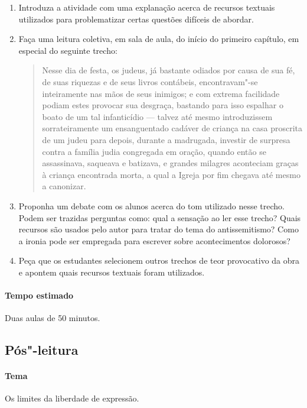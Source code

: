 \documentclass[12pt]{extarticle}
\begin{document}
\begin{enumerate} 

\item Introduza a atividade com uma explanação acerca de recursos textuais 
utilizados para problematizar certas questões difíceis de abordar. 

\item Faça uma leitura coletiva, em sala de aula, do início do primeiro capítulo,
em especial do seguinte trecho:

\begin{quote}
Nesse dia de festa, os judeus,
já bastante odiados por causa de sua fé, de suas riquezas e de seus
livros contábeis, encontravam"-se inteiramente nas mãos de seus
inimigos; e com extrema facilidade podiam estes provocar sua desgraça,
bastando para isso espalhar o boato de um tal infanticídio --- talvez até
mesmo introduzissem sorrateiramente um ensanguentado cadáver de criança
na casa proscrita de um judeu para depois, durante a madrugada,
investir de surpresa contra a família judia congregada em oração,
quando então se assassinava, saqueava e batizava, e grandes milagres
aconteciam graças à criança encontrada morta, a qual a Igreja por fim
chegava até mesmo a canonizar.
\end{quote}

\item Proponha um debate com os alunos acerca do tom utilizado nesse trecho. 
Podem ser trazidas perguntas como: qual a sensação ao ler esse trecho?
Quais recursos são usados pelo autor para tratar do tema do antissemitismo?
Como a ironia pode ser empregada para escrever sobre acontecimentos dolorosos?

\item Peça que os estudantes selecionem outros trechos de teor provocativo da obra
e apontem quais recursos textuais foram utilizados.

\end{enumerate}

\paragraph{Tempo estimado} Duas aulas de 50 minutos. 

\subsection{Pós"-leitura}

\paragraph{Tema} Os limites da liberdade de expressão.
\end{document}
